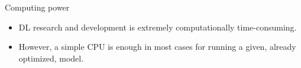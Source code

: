 \documentclass[xcolor=pdftex,dvipsnames,table,mathserif]{beamer}
\begin{document}
\begin{frame}{Computing power}

  \begin{alertblock}{}
    \begin{itemize}
    \item   DL research and development is extremely computationally time-consuming.
    \item   However, a simple CPU is enough in most cases for running a given, already optimized, model.
    \end{itemize}
  \end{alertblock}
\end{frame}














\end{document}
